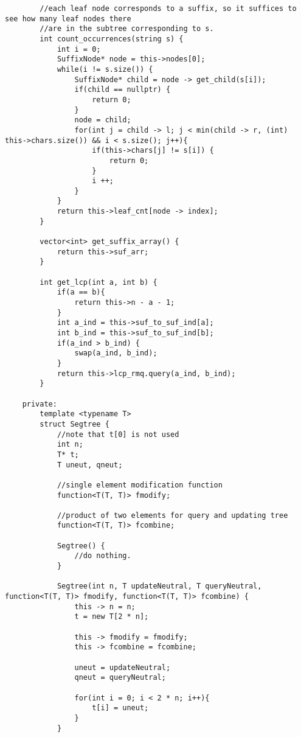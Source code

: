 \documentclass[8pt, headheight=10pt]{scrartcl}
\begin{document}
\begin{multicols*}{3}
\begin{lstlisting}
        //each leaf node corresponds to a suffix, so it suffices to see how many leaf nodes there
        //are in the subtree corresponding to s. 
        int count_occurrences(string s) {
            int i = 0;
            SuffixNode* node = this->nodes[0];
            while(i != s.size()) {
                SuffixNode* child = node -> get_child(s[i]);
                if(child == nullptr) {
                    return 0;
                }
                node = child;
                for(int j = child -> l; j < min(child -> r, (int) this->chars.size()) && i < s.size(); j++){
                    if(this->chars[j] != s[i]) {
                        return 0;
                    }
                    i ++;
                }
            }
            return this->leaf_cnt[node -> index];
        }
        
        vector<int> get_suffix_array() {
            return this->suf_arr;
        }

        int get_lcp(int a, int b) {
            if(a == b){
                return this->n - a - 1;
            }
            int a_ind = this->suf_to_suf_ind[a];
            int b_ind = this->suf_to_suf_ind[b];
            if(a_ind > b_ind) {
                swap(a_ind, b_ind);
            }
            return this->lcp_rmq.query(a_ind, b_ind);
        }

    private:
        template <typename T>
        struct Segtree {
            //note that t[0] is not used
            int n;
            T* t;
            T uneut, qneut;

            //single element modification function
            function<T(T, T)> fmodify;

            //product of two elements for query and updating tree
            function<T(T, T)> fcombine;

            Segtree() {
                //do nothing. 
            }

            Segtree(int n, T updateNeutral, T queryNeutral, function<T(T, T)> fmodify, function<T(T, T)> fcombine) {
                this -> n = n;
                t = new T[2 * n];

                this -> fmodify = fmodify;
                this -> fcombine = fcombine;

                uneut = updateNeutral;
                qneut = queryNeutral;

                for(int i = 0; i < 2 * n; i++){
                    t[i] = uneut;
                }
            }


\end{lstlisting}
\end{multicols*}
\end{document}
